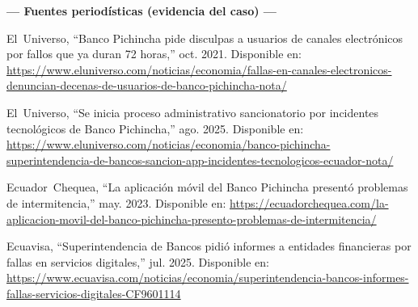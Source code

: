 \documentclass[12pt,a4paper]{article}
\begin{document}
\vspace{0.5cm}
\noindent\textbf{\color{azulP}--- Fuentes period\'isticas (evidencia del caso) ---}
\vspace{0.2cm}

\begin{enumerate}[leftmargin=0.6cm, label={[\arabic*]},
                  start=17, itemsep=6pt]

  \item El~Universo,
        ``Banco Pichincha pide disculpas a usuarios de canales electr\'onicos
        por fallos que ya duran 72 horas,'' oct. 2021.
        Disponible en:
        \url{https://www.eluniverso.com/noticias/economia/fallas-en-canales-electronicos-denuncian-decenas-de-usuarios-de-banco-pichincha-nota/}

  \item El~Universo,
        ``Se inicia proceso administrativo sancionatorio por incidentes
        tecnol\'ogicos de Banco Pichincha,'' ago. 2025.
        Disponible en:
        \url{https://www.eluniverso.com/noticias/economia/banco-pichincha-superintendencia-de-bancos-sancion-app-incidentes-tecnologicos-ecuador-nota/}

  \item Ecuador~Chequea,
        ``La aplicaci\'on m\'ovil del Banco Pichincha present\'o problemas de
        intermitencia,'' may. 2023.
        Disponible en:
        \url{https://ecuadorchequea.com/la-aplicacion-movil-del-banco-pichincha-presento-problemas-de-intermitencia/}

  \item Ecuavisa,
        ``Superintendencia de Bancos pidi\'o informes a entidades financieras
        por fallas en servicios digitales,'' jul. 2025.
        Disponible en:
        \url{https://www.ecuavisa.com/noticias/economia/superintendencia-bancos-informes-fallas-servicios-digitales-CF9601114}

\end{enumerate}
\end{document}
